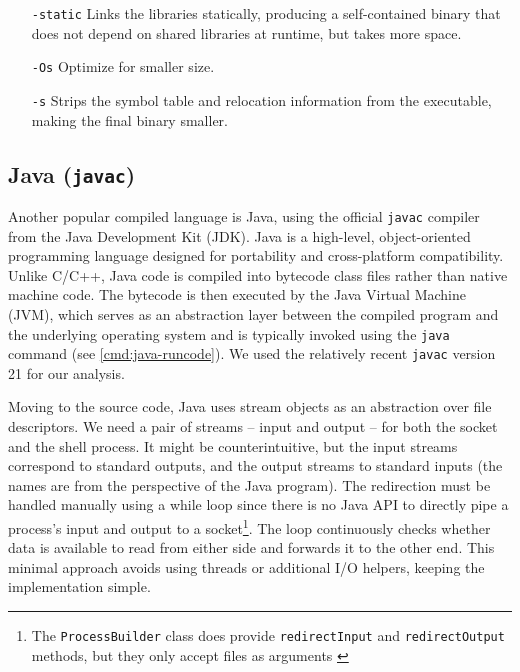 \setlength{\leftmargini}{5em}
\begin{itemize}
\item[\texttt{-static}] Links the libraries statically, producing a self-contained binary that does not depend on shared libraries at runtime, but takes more space.
\item[\texttt{-Os}] Optimize for smaller size.
\item[\texttt{-s}] Strips the symbol table and relocation information from the executable, making the final binary smaller.
\end{itemize}
\setlength{\leftmargini}{2.5em}


\subsection{Java (\texttt{javac})}
\label{sec:java}


Another popular compiled language is Java, using the official \texttt{javac} compiler from the Java Development Kit (JDK). Java is a high-level, object-oriented programming language designed for portability and cross-platform compatibility. Unlike C/C++, Java code is compiled into bytecode class files rather than native machine code. The bytecode is then executed by the Java Virtual Machine (JVM), which serves as an abstraction layer between the compiled program and the underlying operating system \cite{javac-doc} and is typically invoked using the \texttt{java} command (see \cref{cmd:java-runcode}). We used the relatively recent \texttt{javac} version 21 for our analysis.

Moving to the source code, Java uses stream objects as an abstraction over file descriptors. We need a pair of streams -- input and output -- for both the socket and the shell process. It might be counterintuitive, but the input streams correspond to standard outputs, and the output streams to standard inputs (the names are from the perspective of the Java program). The redirection must be handled manually using a while loop since there is no Java API to directly pipe a process's input and output to a socket\footnote{The \texttt{ProcessBuilder} class does provide \texttt{redirectInput} and \texttt{redirectOutput} methods, but they only accept files as arguments \cite{processbuilder-doc}}. The loop continuously checks whether data is available to read from either side and forwards it to the other end. This minimal approach avoids using threads or additional I/O helpers, keeping the implementation simple.

